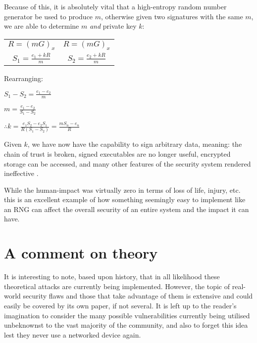     Because of this, it is absolutely vital that a high-entropy random number generator be used to produce $m$, otherwise given two signatures with the same $m$, we are able to determine $m$ \emph{and} private key $k$:
    
    \begin{center}
        \begin{tabular}{ c c }
          $R = (mG)_x$ & $R = (mG)_x$ \\
          $S_1 = \frac{e_1+kR}{m}$ & $S_2 = \frac{e_2+kR}{m}$
        \end{tabular}
    \end{center}
    
    Rearranging:
    \begin{center}
    	$S_1 - S_2 = \frac{e_1-e_2}{m}$
    
    	$m = \frac{e_1-e_2}{S_1-S_2}$
    
    	$\therefore k = \frac{e_1S_2-e_2S_1}{R(S_1-S_2)} = \frac{mS_n-e_n}{R}  $
    \end{center}
    
    Given $k$, we have now have the capability to sign arbitrary data, meaning: the chain of trust is broken, signed executables are no longer useful, encrypted storage can be accessed, and many other features of the security system rendered ineffective \cite{Bushing:2010qs}.
    
    While the human-impact was virtually zero in terms of loss of life, injury, etc. this is an excellent example of how something seemingly easy to implement like an RNG can affect the overall security of an entire system and the impact it can have.

\section{A comment on theory}

It is interesting to note, based upon history, that in all likelihood these theoretical attacks are currently being implemented. However, the topic of real-world security flaws and those that take advantage of them is extensive and could easily be covered by its own paper, if not several. It is left up to the reader's imagination to consider the many possible vulnerabilities currently being utilised unbeknownst to the vast majority of the community, and also to forget this idea lest they never use a networked device again.